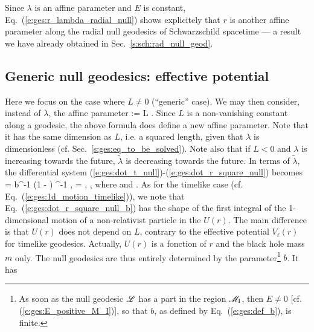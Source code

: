 \begin{remark}
Since $\lambda$ is an affine parameter and $E$ is constant,
Eq.~(\ref{e:ges:r_lambda_radial_null})
shows explicitely that $r$ is another affine parameter along the radial null
geodesics of Schwarzschild spacetime --- a result we have already
obtained in Sec.~\ref{s:sch:rad_null_geod}.
\end{remark}

\subsection{Generic null geodesics: effective potential}
\label{s:ges:null_eff_pot}

Here we focus on the case where $L\not= 0$ (``generic'' case). We may then
consider, instead of $\lambda$, the affine parameter
\be
    \tilde{\lambda} := L \lambda .
\ee
Since $L$ is a non-vanishing constant along a geodesic, the above formula
does define a new affine parameter. Note that it has the same
dimension as $L$, i.e. a squared length, given that $\lambda$ is dimensionless
(cf. Sec.~\ref{s:ges:eq_to_be_solved}). Note also that if $L<0$ and $\lambda$
is increasing towards the future, $\tilde{\lambda}$ is decreasing towards the
future.
In terms of $\tilde{\lambda}$,
the differential system (\ref{e:ges:dot_t_null})-(\ref{e:ges:dot_r_square_null})
becomes
\be \label{e:ges:dot_t_null_b}
    = b^{-1} \left(1 -  \right) ^{-1} ,
\ee
\be \label{e:ges:dot_ph_null_b}
    \frac{\D\ph}{\D\tilde{\lambda}} =   ,
\ee
\be \label{e:ges:dot_r_square_null_b}
   ,
\ee
where
\be \label{e:ges:def_b}
\ee
and
\be \label{e:ges:eff_pot_null}
    .
\ee
As for the timelike case (cf. Eq.~(\ref{e:ges:1d_motion_timelike})),
we note that Eq.~(\ref{e:ges:dot_r_square_null_b})
has the shape of the first integral of the
1-dimensional motion of a non-relativist particle in the
$U(r)$. The main difference is that $U(r)$ does not depend on $L$, contrary
to the effective potential $V_\ell(r)$ for timelike geodesics. Actually,
$U(r)$ is a fonction of $r$ and the black hole mass $m$ only.
The null geodesics are thus entirely determined by the parameter\footnote{
As soon as the null geodesic $\mathscr{L}$ has a part in the
region $\mathscr{M}_{\rm I}$, then $E\not=0$ [cf. (\ref{e:ges:E_positive_M_I})], so that
$b$, as defined by Eq.~(\ref{e:ges:def_b}), is finite.} $b$. It has
